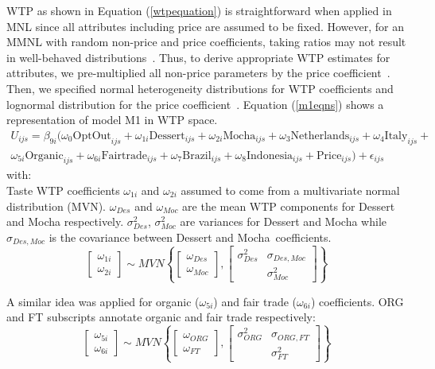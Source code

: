\documentclass[sustainability,article,accept,moreauthors,pdftex,10pt,a4paper]{Definitions/mdpi}
\theoremstyle{mdpi}
\newcounter{re}
\theoremstyle{mdpidefinition}
\begin{document}
{\par{WTP as shown in Equation (\ref{wtpequation}) is straightforward when applied in MNL since all attributes including price are assumed to be fixed. However, for an MMNL with random non-price and price coefficients, taking ratios may not result in well-behaved distributions~\cite{Train2005, Sonnier2007,Daly2012}. Thus, to derive appropriate WTP estimates for attributes, we  pre-multiplied all non-price parameters by the price coefficient~\cite{Hess2012}. Then, we specified normal heterogeneity distributions for WTP coefficients and lognormal distribution for the price coefficient~\cite{Sonnier2007,Hess2012}. Equation (\ref{m1eqns}) shows a representation of model M1 in WTP space.
\begin{multline}\label{m1eqns}
U_{ijs}  = \beta_{9i}(\omega_{0}\mbox{OptOut}_{ijs}+ \omega_{1i}\mbox{Dessert}_{ijs}+\omega_{2i}\mbox{Mocha}_{ijs}+\omega_{3}\mbox{Netherlands}_{ijs}+\omega_{4}\mbox{Italy}_{ijs}+ \\
\omega_{5i}\mbox{Organic}_{ijs}+ \omega_{6i}\mbox{Fairtrade}_{ijs}+\omega_{7}\mbox{Brazil}_{ijs}+\omega_{8}\mbox{Indonesia}_{ijs}+ \mbox{Price}_{ijs}) + \epsilon_{ijs}
\end{multline}
with: \\ Taste WTP coefficients $\omega_{1i}$ and $\omega_{2i}$ assumed to come from a multivariate normal distribution (MVN). $\omega_{Des}$ and $\omega_{Moc}$ are the mean WTP components for Dessert and Mocha respectively. $\sigma^2_{Des}$, $\sigma^2_{Moc}$ are variances for Dessert and Mocha while $\sigma_{Des,Moc}$ is the covariance between Dessert and Mocha~coefficients.  \\
\begin{equation}\label{tasteaqs}
\begin{bmatrix}
\omega_{1i} \\
\omega_{2i}
\end{bmatrix}
\sim MVN\left \{\begin{bmatrix}
\omega_{Des} \\
\omega_{Moc}
\end{bmatrix},\begin{bmatrix}
\sigma^2_{Des} & \sigma_{Des,Moc}\\
& \sigma^2_{Moc}
\end{bmatrix}\right \}
\end{equation}

A similar idea was applied for organic ($\omega_{5i}$) and fair trade ($\omega_{6i}$) coefficients. ORG and FT subscripts annotate organic and fair trade respectively:
\begin{equation}\label{orgft}
\begin{bmatrix}
\omega_{5i} \\
\omega_{6i}
\end{bmatrix}
\sim MVN\left \{\begin{bmatrix}
\omega_{ORG} \\
\omega_{FT}
\end{bmatrix},\begin{bmatrix}
\sigma^2_{ORG} & \sigma_{ORG,FT}\\
& \sigma^2_{FT}
\end{bmatrix}\right \}
\end{equation}

}}
\end{document}
